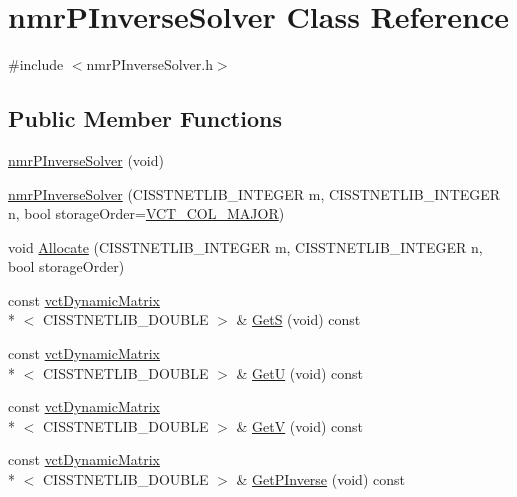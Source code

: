 \hypertarget{classnmr_p_inverse_solver}{\section{nmr\-P\-Inverse\-Solver Class Reference}
\label{classnmr_p_inverse_solver}
}


{\ttfamily \#include $<$nmr\-P\-Inverse\-Solver.\-h$>$}

\subsection*{Public Member Functions}
\begin{DoxyCompactItemize}
\item 
\hyperlink{classnmr_p_inverse_solver_a9eab3e86808e546caf8ce01a99b49781}{nmr\-P\-Inverse\-Solver} (void)
\item 
\hyperlink{classnmr_p_inverse_solver_a418c9b5b28710dd71daadcd7724bf90e}{nmr\-P\-Inverse\-Solver} (C\-I\-S\-S\-T\-N\-E\-T\-L\-I\-B\-\_\-\-I\-N\-T\-E\-G\-E\-R m, C\-I\-S\-S\-T\-N\-E\-T\-L\-I\-B\-\_\-\-I\-N\-T\-E\-G\-E\-R n, bool storage\-Order=\hyperlink{vct_forward_declarations_8h_a432cdf8923afaf82f551450ad4034746}{V\-C\-T\-\_\-\-C\-O\-L\-\_\-\-M\-A\-J\-O\-R})
\item 
void \hyperlink{classnmr_p_inverse_solver_a169037ffcb1c25890f78dd3e72e26cd9}{Allocate} (C\-I\-S\-S\-T\-N\-E\-T\-L\-I\-B\-\_\-\-I\-N\-T\-E\-G\-E\-R m, C\-I\-S\-S\-T\-N\-E\-T\-L\-I\-B\-\_\-\-I\-N\-T\-E\-G\-E\-R n, bool storage\-Order)
\item 
const \hyperlink{classvct_dynamic_matrix}{vct\-Dynamic\-Matrix}\\*
$<$ C\-I\-S\-S\-T\-N\-E\-T\-L\-I\-B\-\_\-\-D\-O\-U\-B\-L\-E $>$ \& \hyperlink{classnmr_p_inverse_solver_ae834714f4d26fc0aa967a736c0458846}{Get\-S} (void) const 
\item 
const \hyperlink{classvct_dynamic_matrix}{vct\-Dynamic\-Matrix}\\*
$<$ C\-I\-S\-S\-T\-N\-E\-T\-L\-I\-B\-\_\-\-D\-O\-U\-B\-L\-E $>$ \& \hyperlink{classnmr_p_inverse_solver_ab0f0b5fbb27a4a2d985f5d4eda8ca3a0}{Get\-U} (void) const 
\item 
const \hyperlink{classvct_dynamic_matrix}{vct\-Dynamic\-Matrix}\\*
$<$ C\-I\-S\-S\-T\-N\-E\-T\-L\-I\-B\-\_\-\-D\-O\-U\-B\-L\-E $>$ \& \hyperlink{classnmr_p_inverse_solver_af1ef358eae9a68c2187e61b12216d9c2}{Get\-V} (void) const 
\item 
const \hyperlink{classvct_dynamic_matrix}{vct\-Dynamic\-Matrix}\\*
$<$ C\-I\-S\-S\-T\-N\-E\-T\-L\-I\-B\-\_\-\-D\-O\-U\-B\-L\-E $>$ \& \hyperlink{classnmr_p_inverse_solver_ac84bcd21764592228112e059154cda0f}{Get\-P\-Inverse} (void) const 
\end{DoxyCompactItemize}
